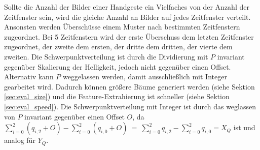 Sollte die Anzahl der Bilder einer Handgeste ein Vielfaches von der Anzahl der Zeitfenster sein, wird die gleiche Anzahl an Bilder auf jedes Zeitfenster verteilt. Ansonsten werden Überschüsse einem Muster
nach bestimmten Zeitfenstern zugeordnet. Bei 5 Zeitfenstern wird der erste Überschuss dem letzten Zeitfenster zugeordnet, der zweite dem ersten, der dritte dem dritten, der vierte dem zweiten.
\newline
\newline
Die Schwerpunktverteilung ist durch die Dividierung mit $P$ invariant gegenüber Skalierung der Helligkeit, jedoch nicht gegenüber einen Offset. Alternativ kann $P$ weggelassen werden, damit ausschließlich
mit Integer gearbeitet wird. Dadurch können größere Bäume generiert werden (siehe Sektion \ref{sec:eval_size}) und die Feature-Extrahierung ist schneller (siehe Sektion \ref{sec:eval_speed}). Die Schwerpunktverteilung
mit Integer ist durch das weglassen von $P$ invariant gegenüber einen Offset $O$, da $\sum_{i=0}^{2}(q_{i,2} + O) - \sum_{i=0}^{2}(q_{i,0} + O)\ =\ \sum_{i=0}^{2} q_{i,2} - \sum_{i=0}^{2} q_{i,0} = X_Q$ ist und analog
für $Y_Q$.
